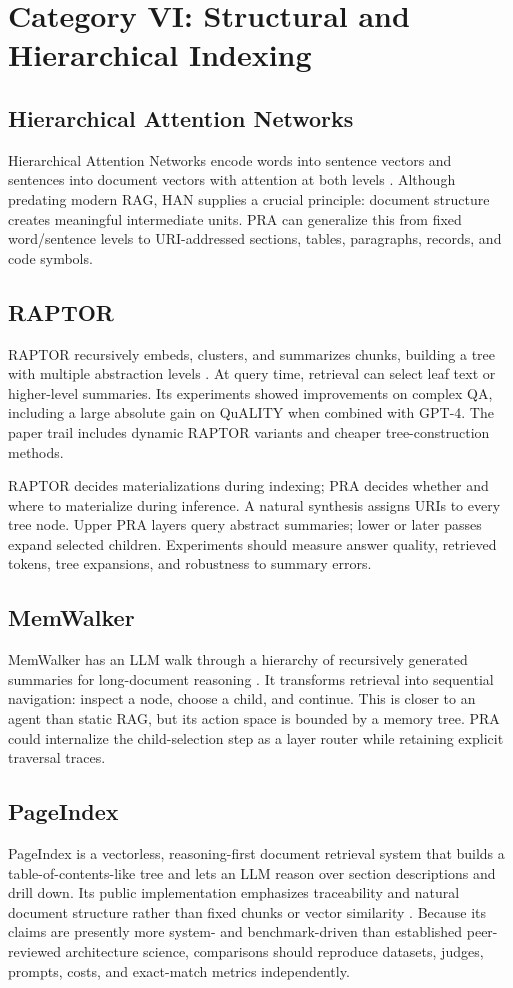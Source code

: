 \documentclass[10pt,a4paper]{article}
\begin{document}
\section{Category VI: Structural and Hierarchical Indexing}
\subsection{Hierarchical Attention Networks}
Hierarchical Attention Networks encode words into sentence vectors and sentences into document vectors with attention at both levels \citep{yang2016han}. Although predating modern RAG, HAN supplies a crucial principle: document structure creates meaningful intermediate units. PRA can generalize this from fixed word/sentence levels to URI-addressed sections, tables, paragraphs, records, and code symbols.

\subsection{RAPTOR}
RAPTOR recursively embeds, clusters, and summarizes chunks, building a tree with multiple abstraction levels \citep{sarthi2024raptor}. At query time, retrieval can select leaf text or higher-level summaries. Its experiments showed improvements on complex QA, including a large absolute gain on QuALITY when combined with GPT-4. The paper trail includes dynamic RAPTOR variants and cheaper tree-construction methods.

RAPTOR decides materializations during indexing; PRA decides whether and where to materialize during inference. A natural synthesis assigns URIs to every tree node. Upper PRA layers query abstract summaries; lower or later passes expand selected children. Experiments should measure answer quality, retrieved tokens, tree expansions, and robustness to summary errors.

\subsection{MemWalker}
MemWalker has an LLM walk through a hierarchy of recursively generated summaries for long-document reasoning \citep{chen2023memwalker}. It transforms retrieval into sequential navigation: inspect a node, choose a child, and continue. This is closer to an agent than static RAG, but its action space is bounded by a memory tree. PRA could internalize the child-selection step as a layer router while retaining explicit traversal traces.

\subsection{PageIndex}
PageIndex is a vectorless, reasoning-first document retrieval system that builds a table-of-contents-like tree and lets an LLM reason over section descriptions and drill down. Its public implementation emphasizes traceability and natural document structure rather than fixed chunks or vector similarity \citep{pageindex2026}. Because its claims are presently more system- and benchmark-driven than established peer-reviewed architecture science, comparisons should reproduce datasets, judges, prompts, costs, and exact-match metrics independently.
\end{document}

